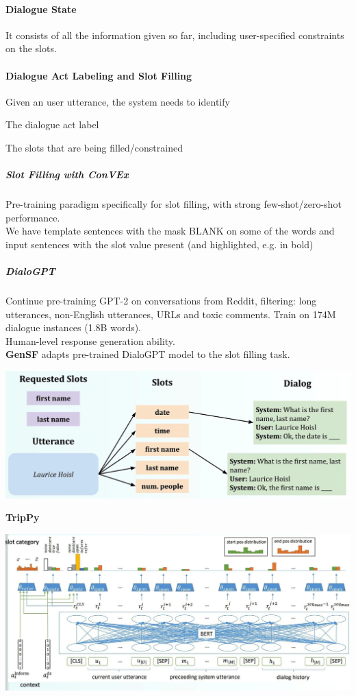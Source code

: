 \documentclass[10pt]{report}
\begin{document}
\paragraph{Dialogue State} It consists of all the information given so far, including user-specified constraints on the slots.
\paragraph{Dialogue Act Labeling and Slot Filling} Given an user utterance, the system needs to identify
\begin{list}{}{}
	\item The dialogue act label
	\item The slots that are being filled/constrained
\end{list}
\subparagraph{Slot Filling with ConVEx} Pre-training paradigm specifically for slot filling, with strong few-shot/zero-shot performance.\\
We have template sentences with the mask BLANK on some of the words and input sentences with the slot value present (and highlighted, e.g. in bold)
\subparagraph{DialoGPT} Continue pre-training GPT-2 on conversations from Reddit, filtering: long utterances, non-English utterances, URLs and toxic comments. Train on 174M dialogue instances (1.8B words).\\
Human-level response generation ability.\\
\textbf{GenSF} adapts pre-trained DialoGPT model to the slot filling task.
\begin{center}
	\includegraphics[scale=0.4]{119.png}
\end{center}
\textbf{TripPy}
\begin{center}
	\includegraphics[scale=0.4]{120.png}
\end{center}
\end{document}
